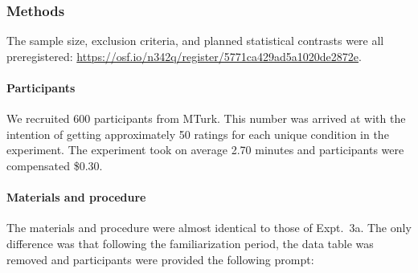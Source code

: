 \documentclass[floatsintext,doc]{apa6}
\let\oldparagraph\paragraph
\renewcommand{\paragraph}[1]{\oldparagraph{#1}\mbox{}}
\let\rmarkdownfootnote\footnote%
\def\footnote{\protect\rmarkdownfootnote}
\begin{document}

\hypertarget{methods-3}{%
\subsubsection{Methods}\label{methods-3}}

The sample size, exclusion criteria, and planned statistical contrasts were all preregistered: \url{https://osf.io/n342q/register/5771ca429ad5a1020de2872e}.

\hypertarget{participants-4}{%
\paragraph{Participants}\label{participants-4}}
%
We recruited 600 participants from MTurk.
This number was arrived at with the intention of getting approximately 50 ratings for each unique condition in the experiment.
The experiment took on average 2.70 minutes and participants were compensated \$0.30.

\hypertarget{materials-and-procedure}{%
\paragraph{Materials and procedure}\label{materials-and-procedure}}
%
The materials and procedure were almost identical to those of Expt.~3a.
The only difference was that following the familiarization period, the data table was removed and participants were provided the following prompt:
\end{document}
